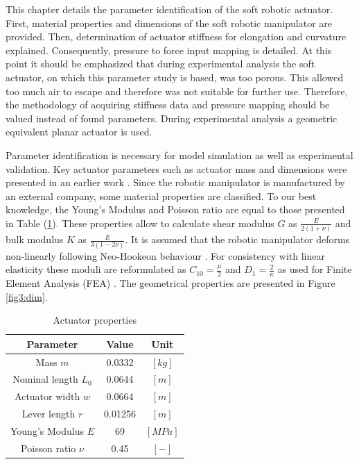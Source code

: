 \label{chap3}

This chapter details the parameter identification of the soft robotic actuator. First, material properties and dimensions of the soft robotic manipulator are provided. Then, determination of actuator stiffness for elongation and curvature explained. Consequently, pressure to force input mapping is detailed. At this point it should be emphasized that during experimental analysis the soft actuator, on which this parameter study is based, was too porous. This allowed too much air to escape and therefore was not suitable for further use. Therefore, the methodology of acquiring stiffness data and pressure mapping should be valued instead of found parameters. During experimental analysis a geometric equivalent planar actuator is used. 


Parameter identification is necessary for model simulation as well as experimental validation. Key actuator parameters such as actuator mass and dimensions were presented in an earlier work \cite{berkers}. Since the robotic manipulator is manufactured by an external company, some material properties are classified. To our best knowledge, the Young's Modulus and Poisson ratio are equal to those presented in Table (\ref{tab4:parameters}). These properties allow to calculate shear modulus $G$ as $\frac{E}{2(1+\nu)}$ and bulk modulus $K$ as $\frac{E}{3(1-2\nu)}$. It is assumed that the robotic manipulator deforms non-linearly following Neo-Hookeon behaviour \cite{Caasenbrood2020StiffnessModel}. For consistency with linear elasticity these moduli are reformulated as $C_{10} = \frac{\mu}{2}$ and $D_{1} = \frac{2}{\kappa}$ as used for Finite Element Analysis (FEA) \cite{neohookean}. The geometrical properties are presented in Figure \ref{fig3:dim}.


\begin{table}[H]
    \centering
    \caption{Actuator properties}
    \begin{tabular}{|c|c|c|} \hline
      \textbf{Parameter}   &  \textbf{Value} & \textbf{Unit} \\ \hline
      Mass $m$             &    0.0332       & $[kg]$ \\ 
      Nominal length $L_0$ &    0.0644       & $[m]$  \\ 
      Actuator width  $w$     &    0.0664       & $[m]$  \\
      Lever length $r$     &    0.01256      & $[m]$  \\ 
      Young's Modulus $E$  &    69           & $[MPa]$\\ 
      Poisson ratio $\nu$ &    0.45         & $[-]$ \\ \hline
    \end{tabular}
    \label{tab4:parameters}
\end{table}

